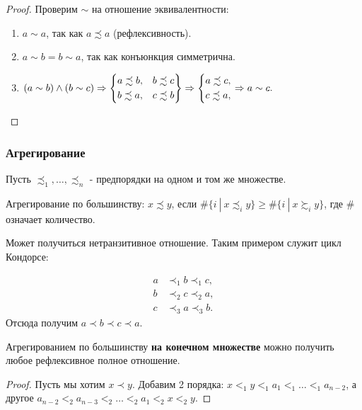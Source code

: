 \begin{proof}
	Проверим $\sim$ на отношение эквивалентности:
	\begin{enumerate}
		\item $a \sim a$, так как $a \precsim a$ (рефлексивность).
		\item $a \sim b = b \sim a$, так как конъюнкция симметрична.
		\item $(a \sim b) \wedge (b \sim c) \Rightarrow \left\{\begin{aligned}
			a \precsim b, & &b \precsim c \\ b \precsim a, & &c \precsim b
		\end{aligned}\right\} \Rightarrow \left\{\begin{aligned}a \precsim c, \\ c \precsim a,\end{aligned}\right. \Rightarrow a \sim c.$
	\end{enumerate}
\end{proof}

\subsubsection*{Агрегирование}

\begin{definition}
	Пусть $\precsim_1, \dots, \precsim_n$ - предпорядки на одном и том же множестве.
	
	Агрегирование по большинству: $x \precsim y$, если $\#\{i\ |\ x \precsim_i y\} \ge \#\{i\ |\ x \succsim_i y\}$, где $\#$ означает количество.
\end{definition}

\begin{note}
	Может получиться нетранзитивное отношение. Таким примером служит цикл Кондорсе:
	
	\begin{align*}
	a &\prec_1 b \prec_1 c,
	\\
	b &\prec_2 c \prec_2 a,
	\\
	c &\prec_3 a \prec_3 b.
	\end{align*}
	Отсюда получим $a \prec b \prec c \prec a$.
\end{note}

\begin{theorem}
	Агрегированием по большинству \textbf{на конечном множестве} можно получить любое рефлексивное полное отношение.
\end{theorem}

\begin{proof}
	Пусть мы хотим $x \prec y$. Добавим 2 порядка: $x <_1 y <_1 a_1 <_1 \dots <_1 a_{n - 2}$, а другое $a_{n - 2} <_2 a_{n - 3} <_2 \dots <_2 a_1 <_2 x <_2 y$.
\end{proof}

